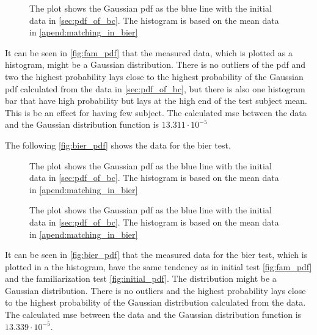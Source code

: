  \begin{figure}[H]
	\centering
	
		\caption{The plot shows the Gaussian  \gls{pdf} as the blue line with the initial data in \autoref{sec:pdf_of_bc}. The histogram is based on the mean data in \autoref{apend:matching_in_bier}}
		\label{fig:fam_normplot}
\end{figure}

It can be seen in \autoref{fig:fam_pdf} that the measured data, which is plotted as a histogram, might be a Gaussian distribution. There is no outliers of the \gls{pdf} and two the highest probability lays close to the highest probability of the Gaussian  \gls{pdf} calculated from the data in \autoref{sec:pdf_of_bc}, but there is also one histogram bar that have high probability but lays at the high end of the test subject mean. This is be an effect for having few subject. The calculated \gls{mse} between the data and the Gaussian distribution function is $13.311 \cdot 10^{-5}$

The following \autoref{fig:bier_pdf} shows the data for the \gls{bier} test.
 \begin{figure}[H]
	\centering
	
		\caption{The plot shows the Gaussian  \gls{pdf} as the blue line with the initial data in \autoref{sec:pdf_of_bc}. The histogram is based on the mean data in \autoref{apend:matching_in_bier}}
		\label{fig:bier_pdf}
\end{figure}

 \begin{figure}[H]
	\centering
	
		\caption{The plot shows the Gaussian  \gls{pdf} as the blue line with the initial data in \autoref{sec:pdf_of_bc}. The histogram is based on the mean data in \autoref{apend:matching_in_bier}}
		\label{fig:bier_normplot}
\end{figure}

It can be seen in \autoref{fig:bier_pdf} that the measured data for the \gls{bier} test, which is plotted in a the histogram, have the same tendency as in initial test \autoref{fig:fam_pdf} and the familiarization test \autoref{fig:initial_pdf}. The distribution might be a Gaussian distribution. There is no outliers and the highest probability lays close to the highest probability of the Gaussian distribution calculated from the data. The calculated \gls{mse} between the data and the Gaussian distribution function is $13.339 \cdot 10^{-5}$.




